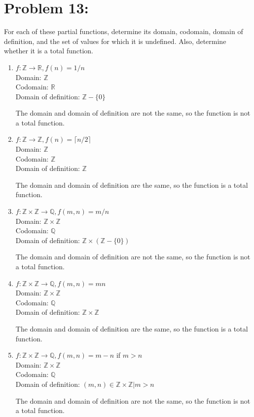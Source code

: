 \documentclass[12pt,en,a4paper]{article}
\begin{document}
	\section*{Problem 13:}
	For each of these partial functions, determine its domain, codomain, domain of definition, and the set of values for which it is undefined. Also, determine whether it is a total function.
	\begin{enumerate}
		\item $f : \mathbb{Z} \rightarrow \mathbb{R}, f(n)=1/n$\\
		Domain: $\mathbb{Z}$\\
		Codomain: $\mathbb{R}$\\
		Domain of definition: $\mathbb{Z}-\{0\}$
		
		The domain and domain of definition are not the same, so the function is not a total function.
		\item $f:\mathbb{Z} \rightarrow \mathbb{Z},f(n)=\lceil n/2 \rceil$\\
		Domain: $\mathbb{Z}$\\
		Codomain: $\mathbb{Z}$\\
		Domain of definition: $\mathbb{Z}$
		
		The domain and domain of definition are the same, so the function is a total function.
		\item $f:\mathbb{Z} \times \mathbb{Z} \rightarrow \mathbb{Q}, f(m,n)=m/n$\\
		Domain: $\mathbb{Z}\times\mathbb{Z}$\\
		Codomain: $\mathbb{Q}$\\
		Domain of definition: $\mathbb{Z}\times(\mathbb{Z}-\{0\})$
		
		The domain and domain of definition are not the same, so the function is not a total function.
		\item $f:\mathbb{Z} \times \mathbb{Z} \rightarrow \mathbb{Q}, f(m,n)=mn$\\
		Domain: $\mathbb{Z}\times\mathbb{Z}$\\
		Codomain: $\mathbb{Q}$\\
		Domain of definition: $\mathbb{Z}\times\mathbb{Z}$
		
		The domain and domain of definition are the same, so the function is a total function.
		\item $f:\mathbb{Z} \times \mathbb{Z} \rightarrow \mathbb{Q}, f(m,n)=m-n$ if $m>n$\\
		Domain: $\mathbb{Z}\times\mathbb{Z}$\\
		Codomain: $\mathbb{Q}$\\
		Domain of definition: $(m,n)\in\mathbb{Z}\times\mathbb{Z}|m>n$
		
		The domain and domain of definition are not the same, so the function is not a total function.
	\end{enumerate}
\newpage
{}
\end{document}
